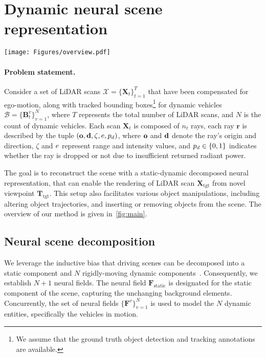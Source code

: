 \section{Dynamic neural scene representation}

\begin{figure*}[t]
    \centering
        \texttt{[image: Figures/overview.pdf]}
        \caption{
        Overview of \dynfl. Our method takes LiDAR scans and tracked bounding boxes of dynamic vehicles as input. \dynfl first decomposes the scene into a static background and $N$ dynamic vehicles, each modelled using a dedicated neural field. These neural fields are then composed to re-simulate LiDAR scans in dynamic scenes. Our composition technique supports various scene edits, including altering object trajectories, removing and adding reconstructed neural assets between scenes.
    }
    \label{fig:main}
\end{figure*}
\paragraph{Problem statement.} 
Consider a set of LiDAR scans $\mathcal{X} = \{\mathbf{X}_t\}_{t=1}^T$ that have been compensated for ego-motion, along with tracked bounding boxes\footnote{We assume that the ground truth object detection and tracking annotations are available.} for dynamic vehicles $\mathcal{B} = \{\mathbf{B}_t^v\}_{v=1}^{N}$, where $T$ represents the total number of LiDAR scans, and $N$ is the count of dynamic vehicles. Each scan $\mathbf{X}_t$ is composed of $n_t$ rays, each ray $\mathbf{r}$ is described by the tuple $(\mathbf{o}, \mathbf{d}, \zeta, e, p_d)$, where $\mathbf{o}$ and $\mathbf{d}$ denote the ray's origin and direction, $\zeta$ and $e$ represent range and intensity values, and $p_d \in \{0,1\}$ indicates whether the ray is dropped or not due to insufficient returned radiant power.


The goal is to reconstruct the scene with a static-dynamic decomposed neural representation, that can enable the rendering of LiDAR scan $\mathbf{X}_{\text{tgt}}$ from novel viewpoint $\mathbf{T}_{\text{tgt}}$. This setup also facilitates various object manipulations, including altering object trajectories, and inserting or removing objects from the scene. The overview of our method is given in~\cref{fig:main}.

\subsection{Neural scene decomposition} \label{sec: decomposition}
We leverage the inductive bias that driving scenes can be decomposed into a static component and $N$ rigidly-moving dynamic components~\cite{huang2022dynamic,gojcic2021weakly}. Consequently, we establish $N+1$ neural fields. The neural field $\mathbf{F}_{\text{static}}$ is designated for the static component of the scene, capturing the unchanging background elements. Concurrently, the set of neural fields $\{\mathbf{F}^v\}_{v=1}^{N}$ is used to model the $N$ dynamic entities, specifically the vehicles in motion.



